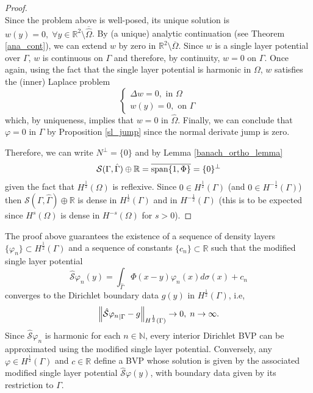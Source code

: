 \begin{proof}
\[    \]
    Since the problem above is well-posed, its unique solution is \(w(y) = 0, \; \forall y \in \mathbb{R}^2\setminus\overline{\hat{\Omega}}\). By (a unique) analytic continuation (see Theorem \eqref{ana_cont}), we can extend \(w\) by zero in \(\mathbb{R}^2\setminus\overline{\Omega}\). Since \(w\) is a single layer potential over \(\Gamma\), \(w\) is continuous on \(\Gamma\) and therefore, by continuity, \(w = 0\) on \(\Gamma\). Once again, using the fact that the single layer potential is harmonic in \(\Omega\), \(w\) satisfies the (inner) Laplace problem
    \[
        \begin{cases}
            \Delta w = 0, \text{ in } \Omega\\
            w(y) = 0, \text{ on } \Gamma
        \end{cases}
    \]
    which, by uniqueness, implies that \(w = 0\) in \(\hat{\Omega}\). Finally, we can conclude that \(\varphi = 0\) in \(\Gamma\) by Proposition \eqref{sl_jump} since the normal derivate jump is zero.

    Therefore, we can write \(N^\perp = \{0\}\) and by Lemma \eqref{banach_ortho_lemma}
    \[
        \mathcal{S}(\Gamma, \hat{\Gamma}) \oplus \mathbb{R} = \overline{\operatorname{span}\{1, \Phi\}} = \{0\}^\perp
    \]
    given the fact that \(H^\frac{1}{2}(\Omega)\) is reflexive. Since \(0 \in H^\frac{1}{2}(\Gamma)\) (and \(0 \in H^{-\frac{1}{2}}(\Gamma)\)) then \(\mathcal{S}(\Gamma, \hat{\Gamma}) \oplus \mathbb{R}\) is dense in \(H^\frac{1}{2}(\Gamma)\) and in \(H^{-\frac{1}{2}}(\Gamma)\) (this is to be expected since \(H^{s}(\Omega)\) is dense in \(H^{-s}(\Omega)\) for \(s > 0\)).
\end{proof}
\begin{remark}\label{remark_density_sequence_density_layers}
    The proof above guarantees the existence of a sequence of density layers \(\{\varphi_n\} \subset H^{\frac{1}{2}}(\Gamma)\) and a sequence of constants \(\{c_n\} \subset \mathbb{R}\) such that the modified single layer potential
    \[
        \hat{\mathcal{S}}\varphi_n(y) = \int_{\hat{\Gamma}} \Phi(x-y)\varphi_n(x) d\sigma(x) + c_n
    \]
    converges to the Dirichlet boundary data \(g(y)\) in \(H^\frac{1}{2}(\Gamma)\), i.e,
    \[
        \norm{{\hat{\mathcal{S}}\varphi_n}_{|\Gamma} - g}_{H^\frac{1}{2}(\Gamma)} \rightarrow 0, \; n \rightarrow \infty.
    \]
    Since \(\hat{\mathcal{S}}\varphi_n\) is harmonic for each \(n \in \mathbb{N}\), every interior Dirichlet \ac{BVP} can be approximated using the modified single layer potential. Conversely, any \(\varphi \in H^\frac{1}{2}(\Gamma)\) and \(c \in \mathbb{R}\) define a \ac{BVP} whose solution is given by the associated modified single layer potential \(\hat{\mathcal{S}}\varphi(y)\), with boundary data given by its restriction to \(\Gamma\).
\end{remark}

